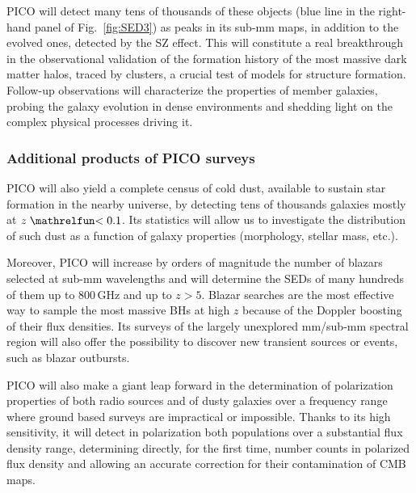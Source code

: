 \documentclass[PICOReport.tex]{subfiles}
\begin{document}
PICO will detect many tens of thousands of these objects (blue line in the right-hand panel of Fig.~\ref{fig:SED3}) as peaks in its sub-mm maps, in addition to the evolved ones, detected by the SZ effect. This will constitute a real breakthrough in the observational validation of the formation history of the most massive dark matter halos, traced by clusters, a crucial test of models for structure formation. Follow-up observations will characterize the properties of member galaxies, probing the galaxy evolution in dense environments and shedding light on the complex physical processes driving it.

\subsubsection{Additional products of PICO surveys}

PICO will also yield a complete census of cold dust, available to sustain star formation in the nearby universe, by detecting tens of thousands galaxies mostly at $z\simlt 0.1$. Its statistics will allow us to investigate the distribution of such dust as a function of galaxy properties (morphology, stellar mass, etc.).

Moreover, PICO will increase by orders of magnitude the number of blazars selected at sub-mm wavelengths and will determine the SEDs of many hundreds of them up to 800\,GHz and up to $z> 5$. Blazar searches are the most effective way to sample the most massive BHs at high $z$ because of the Doppler boosting of their flux densities. Its surveys of the largely unexplored mm/sub-mm spectral region will also offer the possibility to discover new transient sources \cite{Metzger2015} or events, such as blazar outbursts.

PICO will also make a giant leap forward in the determination of
polarization properties of both radio sources and of dusty galaxies over a
frequency range where ground based surveys are impractical or impossible.
Thanks to its high sensitivity, it will detect in polarization both populations over a substantial flux density range, determining directly, for the first time, number counts in polarized flux density and allowing an accurate correction for their contamination of CMB maps.
\end{document}
